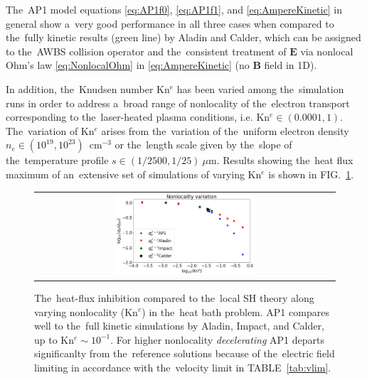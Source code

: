 \documentclass[
 aps,
 jmp,
 amsmath,amssymb,
 twocolumn,
]{revtex4-1}
\newcommand{\figref}[1]{FIG.~\ref{#1}}
\newcommand{\tabref}[1]{TABLE~\ref{#1}}
\newcommand{\figscale}{0.48}
\newcommand{\vect}[1]{\boldsymbol{#1}}
\newcommand{\E}{\vect{E}}
\newcommand{\B}{\vect{B}}
\begin{document}
The~AP1 model equations \eqref{eq:AP1f0}, \eqref{eq:AP1f1}, 
and \eqref{eq:AmpereKinetic} in general show a~very good performance 
in all three cases when compared to the~fully kinetic results 
(green line) by Aladin and Calder, which can be assigned 
to the~AWBS collision operator and the~consistent 
treatment of $\E$ via nonlocal Ohm's law \eqref{eq:NonlocalOhm} in
 \eqref{eq:AmpereKinetic} (no $\B$ field in 1D).

In addition, the~Knudsen number Kn$^e$ has been varied among the~simulation 
runs in order to address a~broad range of nonlocality of 
the~electron transport corresponding 
to the~laser-heated plasma conditions, i.e. Kn$^e \in (0.0001, 1)$. 
The~variation of Kn$^e$ arises from the~variation
of the~uniform electron density $n_e \in (10^{19}, 10^{23})$~cm$^{-3}$ or 
the~length scale given by the~slope of the~temperature profile 
$s \in (1/2500, 1/25)~\mu$m. Results showing the~heat flux maximum 
of an~extensive set of simulations of
varying Kn$^e$ is shown in \figref{fig:Kn_results}.
 \begin{figure}[htb]
  \begin{center}
    \begin{tabular}{c}
      \includegraphics[width=\figscale\textwidth]{Kn_results.png}
    \end{tabular}
  \caption{  
  The~heat-flux inhibition compared to the~local SH theory along varying
  nonlocality (Kn$^e$) in the~heat bath problem. AP1 compares well to 
  the~full kinetic simulations by Aladin, Impact, and Calder, up to 
  Kn$^e \sim 10^{-1}$. For higher nonlocality \textit{decelerating} 
  AP1 departs significanlty from the~reference solutions because of
  the~electric field limiting in accordance with the~velocity limit in 
  \tabref{tab:vlim}. 
  }
  \label{fig:Kn_results}
  \end{center} 
\end{figure}
\end{document}
